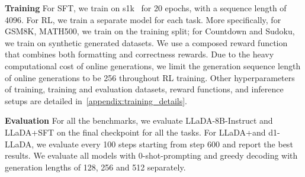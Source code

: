 \textbf{Training} For SFT, we train on s1k~\citep{muennighoff2025s1} for 20 epochs, with a sequence length of 4096. For RL, we train a separate model for each task. More specifically, for GSM8K, MATH500, we train on the training split; for Countdown and Sudoku, we train on synthetic generated datasets. We use a composed reward function that combines both formatting and correctness rewards. Due to the heavy computational cost of online generations, we limit the generation sequence length of online generations to be 256 throughout RL training. Other hyperparameters of training, training and evaluation datasets, reward functions, and inference setups are detailed in~\cref{appendix:training_details}.


\textbf{Evaluation} For all the benchmarks, we evaluate LLaDA-8B-Instruct and LLaDA+SFT on the final checkpoint for all the tasks. For LLaDA+\grpo and d1-LLaDA, we evaluate every 100 steps starting from step 600 and report the best results. We evaluate all models with 0-shot-prompting and greedy decoding with generation lengths of 128, 256 and 512 separately.


